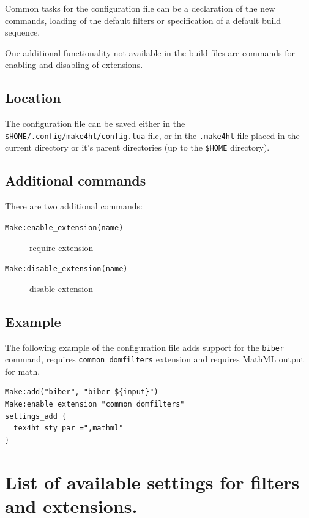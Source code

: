 Common tasks for the configuration file can be a declaration of the new
commands, loading of the default filters or specification of a default
build sequence.

One additional functionality not available in the build files are
commands for enabling and disabling of extensions.

\subsection{Location}\label{location}

The configuration file can be saved either in the
\texttt{\$HOME/.config/make4ht/config.lua} file, or in the
\texttt{.make4ht} file placed in the current directory or it's parent
directories (up to the \texttt{\$HOME} directory).

\subsection{Additional commands}\label{additional-commands}

There are two additional commands:

\begin{description}
\item[\texttt{Make:enable\_extension(name)}]
require extension
\item[\texttt{Make:disable\_extension(name)}]
disable extension
\end{description}

\subsection{Example}\label{example}

The following example of the configuration file adds support for the
\texttt{biber} command, requires \texttt{common\_domfilters} extension
and requires MathML output for math.

\begin{verbatim}
Make:add("biber", "biber ${input}")
Make:enable_extension "common_domfilters"
settings_add {
  tex4ht_sty_par =",mathml"
}
\end{verbatim}

\section{List of available settings for filters and
extensions.}\label{list-of-available-settings-for-filters-and-extensions.}

